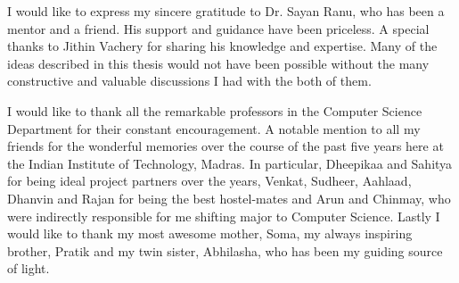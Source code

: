 I would like to express my sincere gratitude to Dr. Sayan Ranu, who has been a mentor and a friend. His support and guidance have been priceless. A special thanks to Jithin Vachery for sharing his knowledge and expertise. Many of the ideas described in this thesis would not have been possible without the many constructive and valuable discussions I had with the both of them.

I would like to thank all the remarkable professors in the Computer Science Department for their constant encouragement. A notable mention to all my friends for the wonderful memories over the course of the past five years here at the Indian Institute of Technology, Madras. In particular, Dheepikaa and Sahitya for being ideal project partners over the years, Venkat, Sudheer, Aahlaad, Dhanvin and Rajan for being the best hostel-mates and Arun and Chinmay, who were indirectly responsible for me shifting major to Computer Science. Lastly I would like to thank my most awesome mother, Soma, my always inspiring brother, Pratik and my twin sister, Abhilasha, who has been my guiding source of light.  
